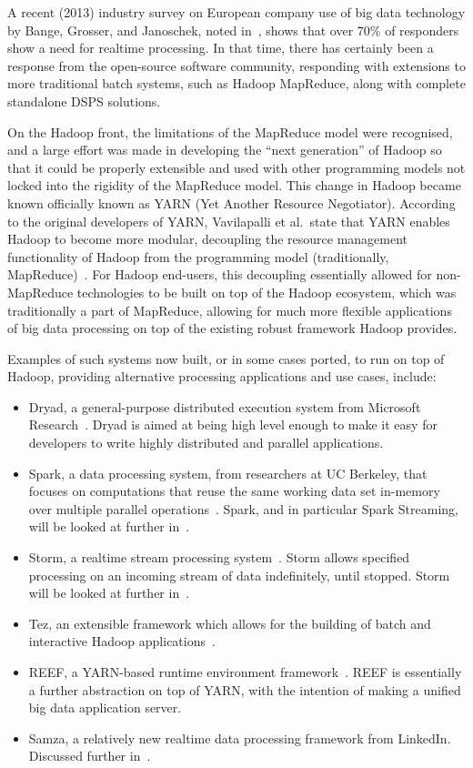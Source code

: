 A recent (2013) industry survey on European company use of big data technology by Bange, Grosser, and Janoschek, noted
in~\cite{industry_bd_survey}, shows that over 70\% of responders show a need for realtime processing. In that time,
there has certainly been a response from the open-source software community, responding with extensions to more
traditional batch systems, such as Hadoop MapReduce, along with complete standalone DSPS solutions.

On the Hadoop front, the limitations of the MapReduce model were recognised, and a large effort was made in developing
the ``next generation'' of Hadoop so that it could be properly extensible and used with other programming models not locked into
the rigidity of the MapReduce model. This change in Hadoop became known officially known as YARN (Yet Another Resource Negotiator). According to
the original developers of YARN, Vavilapalli et al.\ state that YARN enables Hadoop to become more modular, decoupling
the resource management functionality of Hadoop from the programming model (traditionally,
MapReduce)~\cite{vavilapalli_apache_2013}.
For Hadoop end-users, this decoupling essentially allowed for non-MapReduce technologies to be built on top of the Hadoop
ecosystem, which was traditionally a part of MapReduce, allowing for much more flexible applications of big data
processing on top of the existing robust framework Hadoop provides.

Examples of such systems now built, or in some cases ported, to run on top of Hadoop, providing alternative processing
applications and use cases, include:

\begin{itemize}
  \item Dryad, a general-purpose distributed execution system from Microsoft Research~\cite{isard2007dryad}. Dryad is
  aimed at being high level enough to make it easy for developers to write highly distributed and parallel applications.
  \item Spark, a data processing system, from researchers at UC Berkeley, that focuses on computations that reuse the
  same working data set in-memory over multiple parallel operations~\cite{zaharia2010spark}. Spark, and in particular Spark
  Streaming, will be looked at further in~.
  \item Storm, a realtime stream processing system~\cite[p.\ 244]{murthy2013apache}. Storm allows specified processing
  on an incoming stream of data indefinitely, until stopped. Storm will be looked at further in~.
  \item Tez, an extensible framework which allows for the building of batch and interactive Hadoop
  applications~\cite{web_tez}.
  \item REEF, a YARN-based runtime environment framework~\cite{chun2013reef}. REEF is essentially a further abstraction
  on top of YARN, with the intention of making a unified big data application server.
  \item Samza, a relatively new realtime data processing framework from LinkedIn. Discussed further in~.
\end{itemize}

